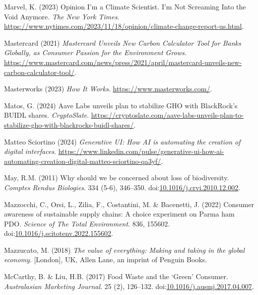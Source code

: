 \documentclass[
  letterpaper,
  DIV=11,
  numbers=noendperiod]{scrartcl}
\newlength{\cslhangindent}
\newenvironment{CSLReferences}[2] %
 {\begin{list}{}{%
  \setlength{\itemindent}{0pt}
  \setlength{\leftmargin}{0pt}
  \setlength{\parsep}{0pt}
  \ifodd #1
   \setlength{\leftmargin}{\cslhangindent}
   \setlength{\itemindent}{-1\cslhangindent}
  \fi
  \setlength{\itemsep}{#2\baselineskip}}}
 {\end{list}}
\begin{document}
\begin{CSLReferences}{0}{1}
Marvel, K. (2023) Opinion {\textbar} {I}'m a {Climate Scientist}. {I}'m
{Not Screaming Into} the {Void Anymore}. \emph{The New York Times}.
\url{https://www.nytimes.com/2023/11/18/opinion/climate-change-report-us.html}.

Mastercard (2021) \emph{Mastercard {Unveils New Carbon Calculator Tool}
for {Banks Globally}, as {Consumer Passion} for the {Environment
Grows}}.
\url{https://www.mastercard.com/news/press/2021/april/mastercard-unveils-new-carbon-calculator-tool/}.

Masterworks (2023) \emph{How {It Works}}.
\url{https://www.masterworks.com/}.

Matos, G. (2024) Aave {Labs} unveils plan to stabilize {GHO} with
{BlackRock}'s {BUIDL} shares. \emph{CryptoSlate}.
\url{https://cryptoslate.com/aave-labs-unveils-plan-to-stabilize-gho-with-blackrocks-buidl-shares/}.

Matteo Sciortino (2024) \emph{Generative {UI}: How {AI} is automating
the creation of digital interfaces}.
\url{https://www.linkedin.com/pulse/generative-ui-how-ai-automating-creation-digital-matteo-sciortino-qa3yf/}.

May, R.M. (2011) Why should we be concerned about loss of biodiversity.
\emph{Comptes Rendus Biologies}. 334 (5-6), 346--350.
doi:\href{https://doi.org/10.1016/j.crvi.2010.12.002}{10.1016/j.crvi.2010.12.002}.

Mazzocchi, C., Orsi, L., Zilia, F., Costantini, M. \& Bacenetti, J.
(2022) Consumer awareness of sustainable supply chains: {A} choice
experiment on {Parma} ham {PDO}. \emph{Science of The Total
Environment}. 836, 155602.
doi:\href{https://doi.org/10.1016/j.scitotenv.2022.155602}{10.1016/j.scitotenv.2022.155602}.

Mazzucato, M. (2018) \emph{The value of everything: Making and taking in
the global economy}. {[}London{]}, UK, Allen Lane, an imprint of Penguin
Books.

McCarthy, B. \& Liu, H.B. (2017) Food {Waste} and the {`{Green}'}
{Consumer}. \emph{Australasian Marketing Journal}. 25 (2), 126--132.
doi:\href{https://doi.org/10.1016/j.ausmj.2017.04.007}{10.1016/j.ausmj.2017.04.007}.


\end{CSLReferences}
\end{document}
